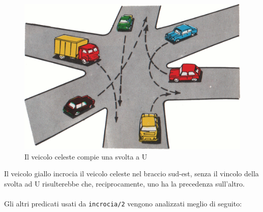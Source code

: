 \begin{figure}[!htb]
	\centering
	\includegraphics[width=.5\textwidth]{images/movement/uturn}
	\caption{Il veicolo celeste compie una svolta a U}
\end{figure}

Il veicolo giallo incrocia il veicolo celeste nel braccio sud-est, senza il vincolo della svolta ad U risulterebbe che, reciprocamente, uno ha la precedenza sull'altro.
\\\\
\indent Gli altri predicati usati da \texttt{incrocia/2} vengono analizzati meglio di seguito:

